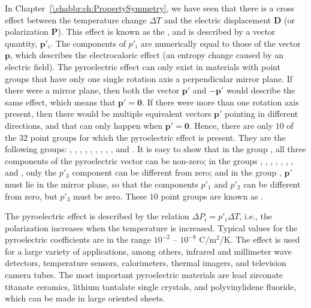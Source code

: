 In Chapter~\ref{\chabbr:ch:PropertySymmetry}, we have seen that there is a cross effect between the temperature change $\Delta T$ and the electric displacement $\mathbf{D}$ (or polarization $\mathbf{P}$).  This effect is known as the , and is described by a vector quantity, $\mathbf{p}'_i$.  The components of $p'_i$ are numerically equal to those of the vector $\mathbf{p}$, which describes the electrocaloric effect (an entropy change caused by an electric field).  The pyroelectric effect can only exist in materials with point groups that have only one single rotation axis  a perpendicular mirror plane.  If there were a mirror plane, then both the vector $\mathbf{p}'$ and $-\mathbf{p}'$ would describe the same effect, which means that $\mathbf{p}'=\mathbf{0}$.  If there were more than one rotation axis present, then there would be multiple equivalent vectors $\mathbf{p}'$ pointing in different directions, and that can only happen when $\mathbf{p}'=\mathbf{0}$.  Hence, there are only $10$ of the $32$ point groups for which the pyroelectric effect is present.  They are the following groups:  , , , , , , , , , and .  It is easy to show that in the group , all three components of the pyroelectric vector can be non-zero; in the groups , , , , , , , and , only the $p'_3$ component can be different from zero;  and in the group , $\mathbf{p'}$ must lie in the mirror plane, so that the components $p'_1$  and $p'_2$ can be different from zero, but $p'_3$ must be zero. These $10$ point groups are known as .

The pyroelectric effect is described by the relation $\Delta P_i =  p'_i\Delta T$, i.e., the polarization increases when the temperature is increased.  Typical values for the pyroelectric coefficients are in the range $10^{-2}$ -- $10^{-8}$ C/m$^2$/K.  The effect is used for a large variety of applications, among others, infrared and millimeter wave detectors, temperature sensors, calorimeters,  thermal imagers, and television camera tubes.  The most important pyroelectric materials are lead zirconate  titanate ceramics, lithium tantalate single crystals, and polyvinylidene fluoride, which can be made in large oriented sheets.  

